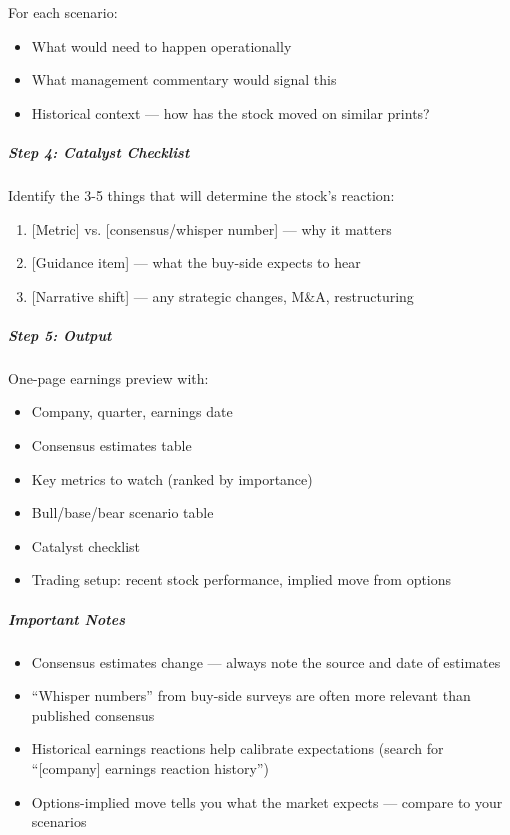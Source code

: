 \documentclass[11pt]{article}
\begin{document}
For each scenario:

\begin{itemize}[leftmargin=*,itemsep=2pt,topsep=2pt]
\item {} What would need to happen operationally
\item {} What management commentary would signal this
\item {} Historical context — how has the stock moved on similar prints?
\end{itemize}

\subparagraph{Step 4: Catalyst Checklist}\mbox{}\par

Identify the 3-5 things that will determine the stock's reaction:


\begin{enumerate}[leftmargin=*,itemsep=2pt,topsep=2pt]
\item {} [Metric] vs. [consensus/whisper number] — why it matters
\item {} [Guidance item] — what the buy-side expects to hear
\item {} [Narrative shift] — any strategic changes, M\&A, restructuring
\end{enumerate}

\subparagraph{Step 5: Output}\mbox{}\par

One-page earnings preview with:

\begin{itemize}[leftmargin=*,itemsep=2pt,topsep=2pt]
\item {} Company, quarter, earnings date
\item {} Consensus estimates table
\item {} Key metrics to watch (ranked by importance)
\item {} Bull/base/bear scenario table
\item {} Catalyst checklist
\item {} Trading setup: recent stock performance, implied move from options
\end{itemize}

\subparagraph{Important Notes}\mbox{}\par

\begin{itemize}[leftmargin=*,itemsep=2pt,topsep=2pt]
\item {} Consensus estimates change — always note the source and date of estimates
\item {} ``Whisper numbers'' from buy-side surveys are often more relevant than published consensus
\item {} Historical earnings reactions help calibrate expectations (search for ``[company] earnings reaction history'')
\item {} Options-implied move tells you what the market expects — compare to your scenarios
\end{itemize}
\end{document}

